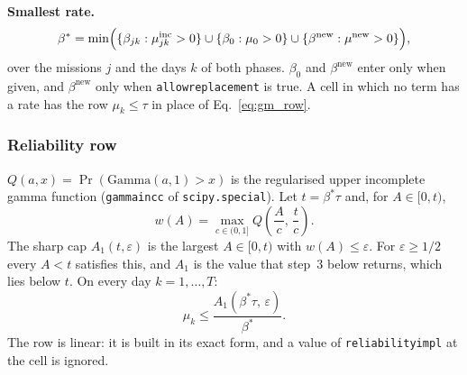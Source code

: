 \documentclass[11pt,a4paper]{article}
\theoremstyle{plain}
\theoremstyle{definition}
\newcommand{\inc}{\mathrm{inc}}
\newcommand{\new}{\mathrm{new}}
\renewcommand{\_}{\textunderscore\allowbreak{}}
\begin{document}
\textbf{Smallest rate.}
\begin{equation}
  \beta^* = \min\Bigl(\{\beta_{jk} : \mu^{\inc}_{jk} > 0\}
    \cup \{\beta_0 : \mu_0 > 0\} \cup \{\beta^{\new} : \mu^{\new} > 0\}\Bigr),
  \label{eq:gm_betastar}
\end{equation}
over the missions $j$ and the days $k$ of both phases. $\beta_0$ and $\beta^{\new}$
enter only when given, and $\beta^{\new}$ only when \texttt{allow\_replacement} is
true. A cell in which no term has a rate has the row $\mu_k \leq \tau$ in place of
Eq.~\eqref{eq:gm_row}.

\subsubsection{Reliability row}

$Q(a, x) = \Pr(\mathrm{Gamma}(a, 1) > x)$ is the regularised upper incomplete gamma
function (\texttt{gammaincc} of \texttt{scipy.special}). Let $t = \beta^*\tau$ and, for
$A \in [0, t)$,
\[
  w(A) = \max_{c \in (0, 1]} Q\!\left(\frac{A}{c},\, \frac{t}{c}\right).
\]
The sharp cap $A_1(t, \varepsilon)$ is the largest $A \in [0, t)$ with
$w(A) \leq \varepsilon$. For $\varepsilon \geq 1/2$ every $A < t$ satisfies this,
and $A_1$ is the value that step~3 below returns, which lies below $t$. On every
day $k = 1, \ldots, T$:
\begin{equation}
  \mu_k \leq \frac{A_1(\beta^*\tau,\, \varepsilon)}{\beta^*}.
  \label{eq:gm_row}
\end{equation}
The row is linear: it is built in its exact form, and a value of
\texttt{reliability\_impl} at the cell is ignored.
\end{document}
